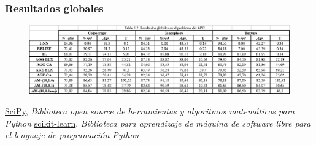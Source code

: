 \documentclass[12pt,a4paper]{article}
\begin{document}
\subsubsection{Resultados globales}
\begin{figure}[H]
	\centering
	\includegraphics[width=0.7\linewidth]{images/poblacion11}
	\caption{}
	\label{fig:poblacion11}
\end{figure}

\clearpage
\begin{thebibliography}{H}
	 \href{www.scipy.org}{SciPy},
	\textit{Biblioteca open source de herramientas y algoritmos matemáticos para Python } 
	 \href{https://scikit-learn.org}{scikit-learn},
	\textit{Biblioteca para aprendizaje de máquina de software libre para el lenguaje de programación Python} 
\end{thebibliography}
\end{document}
